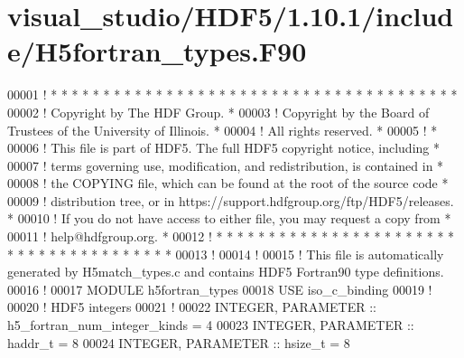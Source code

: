 \hypertarget{visual__studio_2_h_d_f5_21_810_81_2include_2_h5fortran__types_8_f90_source}{}\section{visual\+\_\+studio/\+H\+D\+F5/1.10.1/include/\+H5fortran\+\_\+types.F90}
\label{visual__studio_2_h_d_f5_21_810_81_2include_2_h5fortran__types_8_f90_source}

\begin{DoxyCode}
00001 \textcolor{comment}{! * * * * * * * * * * * * * * * * * * * * * * * * * * * * * * * * * * * * * * * }
00002 \textcolor{comment}{!   Copyright by The HDF Group.                                               *}
00003 \textcolor{comment}{!   Copyright by the Board of Trustees of the University of Illinois.         *}
00004 \textcolor{comment}{!   All rights reserved.                                                      *}
00005 \textcolor{comment}{!                                                                             *}
00006 \textcolor{comment}{!   This file is part of HDF5.  The full HDF5 copyright notice, including     *}
00007 \textcolor{comment}{!   terms governing use, modification, and redistribution, is contained in    *}
00008 \textcolor{comment}{!   the COPYING file, which can be found at the root of the source code       *}
00009 \textcolor{comment}{!   distribution tree, or in https://support.hdfgroup.org/ftp/HDF5/releases.  *}
00010 \textcolor{comment}{!   If you do not have access to either file, you may request a copy from     *}
00011 \textcolor{comment}{!   help@hdfgroup.org.                                                        *}
00012 \textcolor{comment}{! * * * * * * * * * * * * * * * * * * * * * * * * * * * * * * * * * * * * * * *}
00013 \textcolor{comment}{!}
00014 \textcolor{comment}{!}
00015 \textcolor{comment}{! This file is automatically generated by H5match\_types.c and contains HDF5 Fortran90 type definitions.}
00016 \textcolor{comment}{!}
00017        \textcolor{keyword}{MODULE} h5fortran\_types
00018          \textcolor{keywordtype}{USE }iso\_c\_binding
00019          \textcolor{comment}{!}
00020          \textcolor{comment}{!  HDF5 integers}
00021          \textcolor{comment}{!}
00022         \textcolor{keywordtype}{INTEGER}, \textcolor{keywordtype}{PARAMETER} :: h5\_fortran\_num\_integer\_kinds = 4
00023         \textcolor{keywordtype}{INTEGER}, \textcolor{keywordtype}{PARAMETER} :: haddr\_t = 8
00024         \textcolor{keywordtype}{INTEGER}, \textcolor{keywordtype}{PARAMETER} :: hsize\_t = 8

\end{DoxyCode}
